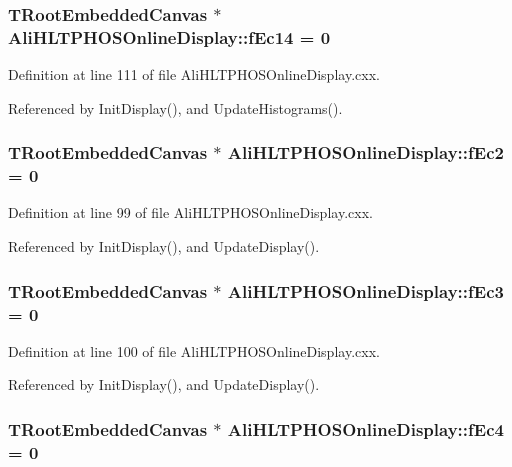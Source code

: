 \subsubsection{\setlength{\rightskip}{0pt plus 5cm}TRoot\-Embedded\-Canvas $\ast$ {\bf Ali\-HLTPHOSOnline\-Display::f\-Ec14} = 0\hspace{0.3cm}{\tt  [static, private]}}\label{classAliHLTPHOSOnlineDisplay_v35}




Definition at line 111 of file Ali\-HLTPHOSOnline\-Display.cxx.

Referenced by Init\-Display(), and Update\-Histograms().
\subsubsection{\setlength{\rightskip}{0pt plus 5cm}TRoot\-Embedded\-Canvas $\ast$ {\bf Ali\-HLTPHOSOnline\-Display::f\-Ec2} = 0\hspace{0.3cm}{\tt  [static, private]}}\label{classAliHLTPHOSOnlineDisplay_v23}




Definition at line 99 of file Ali\-HLTPHOSOnline\-Display.cxx.

Referenced by Init\-Display(), and Update\-Display().
\subsubsection{\setlength{\rightskip}{0pt plus 5cm}TRoot\-Embedded\-Canvas $\ast$ {\bf Ali\-HLTPHOSOnline\-Display::f\-Ec3} = 0\hspace{0.3cm}{\tt  [static, private]}}\label{classAliHLTPHOSOnlineDisplay_v24}




Definition at line 100 of file Ali\-HLTPHOSOnline\-Display.cxx.

Referenced by Init\-Display(), and Update\-Display().
\subsubsection{\setlength{\rightskip}{0pt plus 5cm}TRoot\-Embedded\-Canvas $\ast$ {\bf Ali\-HLTPHOSOnline\-Display::f\-Ec4} = 0\hspace{0.3cm}{\tt  [static, private]}}\label{classAliHLTPHOSOnlineDisplay_v25}




